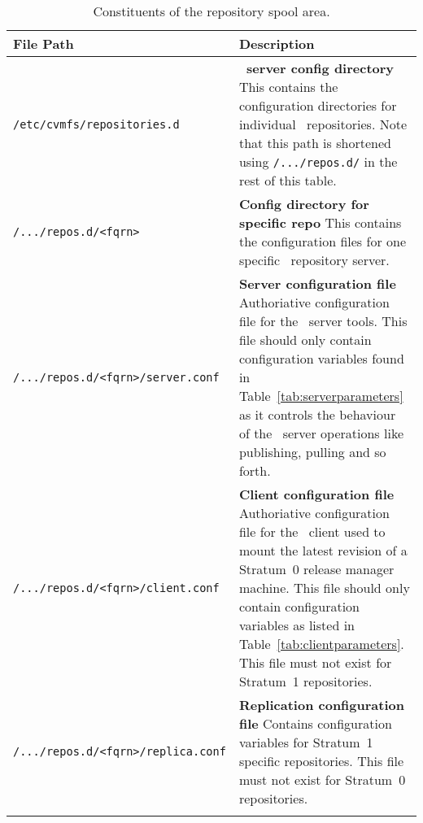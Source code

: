 \begin{longtable}{lX}
	\toprule
	{\bf\centering File Path} & {\bf\centering Description} \\
	\midrule

	\texttt{/etc/cvmfs/repositories.d} & \textbf{\cvmfs\ server config directory} \newline
	This contains the configuration directories for individual \cvmfs\ repositories. Note that this path is shortened using \texttt{/.../repos.d/} in the rest of this table. \\
	\addlinespace

	\texttt{/.../repos.d/<fqrn>} & \textbf{Config directory for specific repo} \newline
	This contains the configuration files for one specific \cvmfs\ repository server. \\
	\addlinespace

	\texttt{/.../repos.d/<fqrn>/server.conf} & \textbf{Server configuration file} \newline
	Authoriative configuration file for the \cvmfs\ server tools. This file should only contain configuration variables found in Table~\ref{tab:serverparameters} as it controls the behaviour of the \cvmfs\ server operations like publishing, pulling and so forth. \\
	\addlinespace

	\texttt{/.../repos.d/<fqrn>/client.conf} & \textbf{Client configuration file} \newline
	Authoriative configuration file for the \cvmfs\ client used to mount the latest revision of a Stratum~0 release manager machine. This file should only contain configuration variables as listed in Table~\ref{tab:clientparameters}. This file must not exist for Stratum~1 repositories. \\
	\addlinespace

	\texttt{/.../repos.d/<fqrn>/replica.conf} & \textbf{Replication configuration file} \newline
	Contains configuration variables for Stratum~1 specific repositories. This file must not exist for Stratum~0 repositories. \\
	\addlinespace

	\bottomrule
	\caption{Constituents of the repository spool area.}
	\label{tbl:repoconfiganatomy}
\end{longtable}